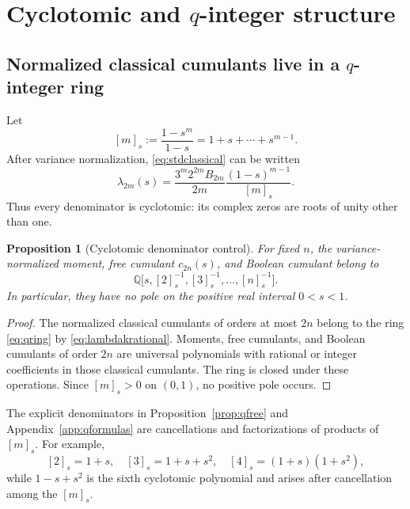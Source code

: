 \documentclass[11pt]{article}
\newtheorem{proposition}[theorem]{Proposition}
\theoremstyle{definition}
\begin{document}
\section{Cyclotomic and \texorpdfstring{\(q\)}{q}-integer structure}
\subsection{Normalized classical cumulants live in a \texorpdfstring{\(q\)}{q}-integer ring}
Let
\[
[m]_s:=\frac{1-s^m}{1-s}=1+s+\cdots+s^{m-1}.
\]
After variance normalization, \eqref{eq:stdclassical} can be written
\begin{equation}\label{eq:lambdakrational}
\lambda_{2m}(s)=
\frac{3^m2^{2m}B_{2m}}{2m}\frac{(1-s)^{m-1}}{[m]_s}.
\end{equation}
Thus every denominator is cyclotomic: its complex zeros are roots of unity other than one.

\begin{proposition}[Cyclotomic denominator control]\label{prop:cyclotomic}
For fixed \(n\), the variance-normalized moment, free cumulant \(c_{2n}(s)\), and Boolean cumulant belong to
\begin{equation}\label{eq:qring}
\mathbb Q\bigl[s,[2]_s^{-1},[3]_s^{-1},\ldots,[n]_s^{-1}\bigr].
\end{equation}
In particular, they have no pole on the positive real interval \(0<s<1\).
\end{proposition}
\begin{proof}
The normalized classical cumulants of orders at most \(2n\) belong to the ring \eqref{eq:qring} by \eqref{eq:lambdakrational}. Moments, free cumulants, and Boolean cumulants of order \(2n\) are universal polynomials with rational or integer coefficients in those classical cumulants. The ring is closed under these operations. Since \([m]_s>0\) on \((0,1)\), no positive pole occurs.
\end{proof}

The explicit denominators in Proposition~\ref{prop:qfree} and Appendix~\ref{app:qformulas} are cancellations and factorizations of products of \([m]_s\). For example,
\[
[2]_s=1+s,
\quad [3]_s=1+s+s^2,
\quad [4]_s=(1+s)(1+s^2),
\]
while \(1-s+s^2\) is the sixth cyclotomic polynomial and arises after cancellation among the \([m]_s\).
\end{document}
